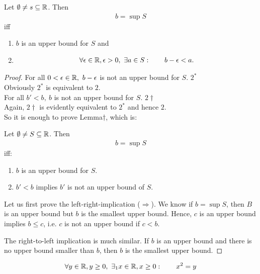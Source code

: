 \begin{lm}
	Let $\emptyset \neq s \subseteq \mathbb R$. Then 
	\begin{align*}
	b = \sup S
	\end{align*}
	iff
	\begin{enumerate}
		\item
		$b$ is an upper bound for $S$ and
		\item
		\begin{align*}
		\forall \epsilon \in \mathbb R, \epsilon >0, ~\exists a \in S: \qquad b - \epsilon < a.
		\end{align*}
	\end{enumerate}
\end{lm}

\begin{proof}
	For all $0<\epsilon\in\mathbb R, ~b-\epsilon$ is not an upper bound for $S$. \hfill $2^*$ \\
	Obviously $2^*$ is equivalent to $2$. \\
	For all $b' <b, ~ b$ is not an upper bound for $S$. \hfill $2 \dagger$ \\
	Again, $2\dagger$ is evidently equivalent to $2^*$ and hence $2$. \\
	So it is enough to prove Lemma$\dagger$, which is: 
	
	Let $\emptyset \neq S \subseteq \mathbb R$. Then
	\begin{align*}
	b = \sup S
	\end{align*}
	iff:
	\begin{enumerate}
		\item
		$b$ is an upper bound for $S$. 
		\item
		$b'<b$ implies $b'$ is not an upper bound of $S$.
	\end{enumerate}
	Let us first prove the left-right-implication ($\Rightarrow$). We know if $b = \sup S$, then $B$ is an upper bound but $b$ is the smallest upper bound. Hence, $c$ is an upper bound implies $b \le c$, i.e. $c$ is not an upper bound if $c<b$. 
	
	The right-to-left implication is much similar. If $b$ is an upper bound and there is no upper bound smaller than $b$, then $b$ is the smallest upper bound.
\end{proof}


\begin{tm}
	\begin{align*}
		\forall y \in \mathbb R, y \ge 0, ~ \exists_1 x \in \mathbb R, x \ge 0: \qquad x^2 = y
	\end{align*}
	
\end{tm}

